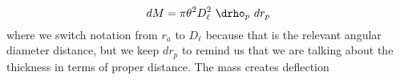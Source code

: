 \begin{equation}
  dM = \pi\theta^2 D_\ell^2\ \drho_p\ dr_p
\end{equation}
where we switch notation from $r_a$ to $D_\ell$ because that is the relevant angular diameter distance, but we keep $dr_p$ to remind us that we are talking about the thickness in terms of proper distance.  The mass creates deflection